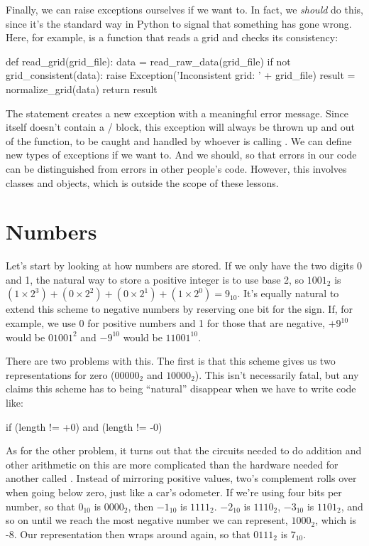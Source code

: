 Finally, we can raise exceptions ourselves if we want to. In fact, we
\emph{should} do this, since it's the standard way in Python to signal
that something has gone wrong. Here, for example, is a function that
reads a grid and checks its consistency:

\begin{VerbIn}
def read_grid(grid_file):
    data = read_raw_data(grid_file)
    if not grid_consistent(data):
        raise Exception('Inconsistent grid: ' + grid_file)
    result = normalize_grid(data)
    return result
\end{VerbIn}

The  statement creates a new exception with a meaningful
error message. Since  itself doesn't contain a
/ block, this exception will always be thrown
up and out of the function, to be caught and handled by whoever is
calling . We can define new types of exceptions if we
want to. And we should, so that errors in our code can be distinguished
from errors in other people's code. However, this involves classes and
objects, which is outside the scope of these lessons.

\section{Numbers}

Let's start by looking at how numbers are stored. If we only have the
two digits 0 and 1, the natural way to store a positive integer is to
use base 2, so $1001_{2}$ is
$(1{\times}2^{3})+(0{\times}2^{2})+(0{\times}2^{1})+(1{\times}2^{0}) = 9_{10}$.
It's equally natural to extend this scheme to
negative numbers by reserving one bit for the sign. If, for example, we
use 0 for positive numbers and 1 for those that are negative,
$+9^{10}$ would be $01001^{2}$ and
$-9^{10}$ would be $11001^{10}$.

There are two problems with this. The first is that this scheme gives us
two representations for zero ($00000_{2}$ and
$10000_{2}$). This isn't necessarily fatal, but any claims
this scheme has to being ``natural'' disappear when we have to write
code like:

\begin{VerbIn}
if (length != +0) and (length != -0)
\end{VerbIn}

As for the other problem, it turns out that the circuits needed to do
addition and other arithmetic on this
 are
more complicated than the hardware needed for another called
. Instead of mirroring
positive values, two's complement rolls over when going below zero, just
like a car's odometer. If we're using four bits per number, so that
$0_{10}$ is $0000_{2}$, then $-1_{10}$
is $1111_{2}$. $-2_{10}$ is $1110_{2}$,
$-3_{10}$ is $1101_{2}$, and so on until we reach
the most negative number we can represent, $1000_{2}$, which
is -8. Our representation then wraps around again, so that
$0111_{2}$ is $7_{10}$.

